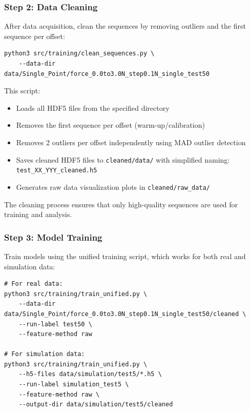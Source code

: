 \documentclass[11pt,a4paper]{article}
\begin{document}
\subsubsection{Step 2: Data Cleaning}
After data acquisition, clean the sequences by removing outliers and the first sequence per offset:
\begin{verbatim}
python3 src/training/clean_sequences.py \
    --data-dir data/Single_Point/force_0.0to3.0N_step0.1N_single_test50
\end{verbatim}
This script:
\begin{itemize}[leftmargin=1.5em]
    \item Loads all HDF5 files from the specified directory
    \item Removes the first sequence per offset (warm-up/calibration)
    \item Removes 2 outliers per offset independently using MAD outlier detection
    \item Saves cleaned HDF5 files to \texttt{cleaned/data/} with simplified naming: \texttt{test\_XX\_YYY\_cleaned.h5}
    \item Generates raw data visualization plots in \texttt{cleaned/raw\_data/}
\end{itemize}
The cleaning process ensures that only high-quality sequences are used for training and analysis.

\subsubsection{Step 3: Model Training}
Train models using the unified training script, which works for both real and simulation data:
\begin{verbatim}
# For real data:
python3 src/training/train_unified.py \
    --data-dir data/Single_Point/force_0.0to3.0N_step0.1N_single_test50/cleaned \
    --run-label test50 \
    --feature-method raw

# For simulation data:
python3 src/training/train_unified.py \
    --h5-files data/simulation/test5/*.h5 \
    --run-label simulation_test5 \
    --feature-method raw \
    --output-dir data/simulation/test5/cleaned
\end{verbatim}
\end{document}
